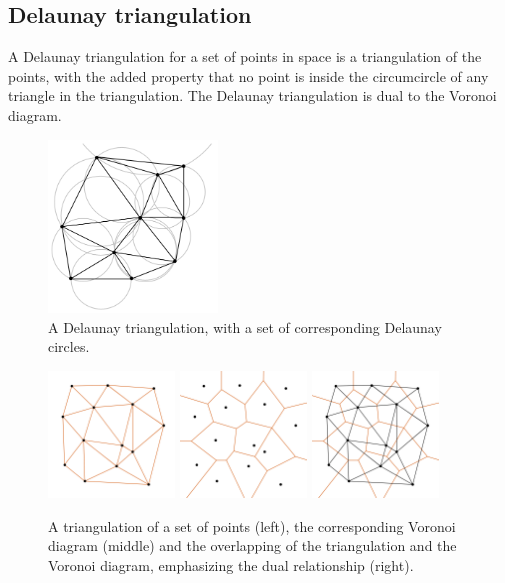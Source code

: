 \documentclass[a4paper,12pt]{article}
\begin{document}
\subsection{Delaunay triangulation}
A Delaunay triangulation for a set of points in space is a triangulation of the points, with the added property that no point is inside the circumcircle of any triangle in the triangulation. \newline
The Delaunay triangulation is dual to the Voronoi diagram. 

\begin{figure}[hb]
\centering
\includegraphics[width=0.4\textwidth]{pictures/Delaunay_circumcircles.png}
 \caption[Close up of \textit{Hemidactylus} sp.]
{A Delaunay triangulation, with a set of corresponding Delaunay circles.}
\end{figure}



\begin{figure}[hb]
\centering
\includegraphics[width=0.3\textwidth]{pictures/Delaunay-Triangulation1.png}
\includegraphics[width=0.3\textwidth]{pictures/Delaunay-Triangulation2.png}
\includegraphics[width=0.3\textwidth]{pictures/Delaunay-Triangulation3.png}
 \caption[Close up of \textit{Hemidactylus} sp.]{
A triangulation of a set of points (left), the corresponding Voronoi diagram (middle) and the overlapping of the triangulation and the Voronoi diagram, emphasizing the dual relationship (right).}
\end{figure}
\end{document}
